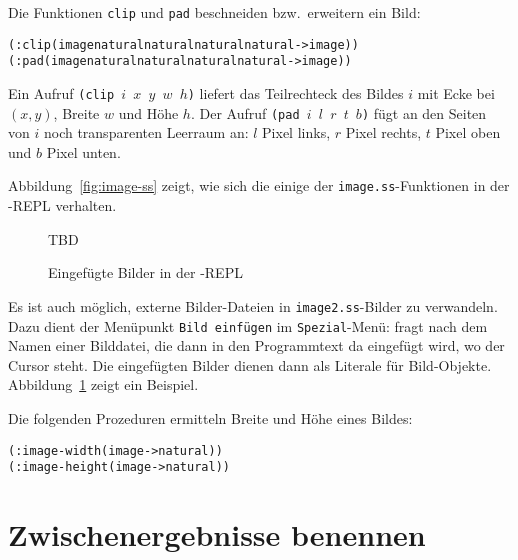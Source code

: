 Die Funktionen \texttt{clip} und \texttt{pad} beschneiden bzw.\
erweitern ein Bild:
%
\begin{alltt}
(: clip (image natural natural natural natural -> image))
(: pad  (image natural natural natural natural -> image))
\end{alltt}
%
Ein Aufruf \texttt{(clip $i$ $x$ $y$ $w$ $h$)} liefert 
das Teilrechteck des Bildes $i$ mit Ecke bei $(x, y)$, Breite $w$ und
Höhe $h$.  Der Aufruf \texttt{(pad $i$ $l$ $r$ $t$ $b$)}
fügt an den Seiten von $i$ noch transparenten Leerraum an: $l$ Pixel
links, $r$ Pixel rechts, $t$ Pixel oben und $b$ Pixel unten.

Abbildung~\ref{fig:image-ss} zeigt, wie sich die einige der
\texttt{image.ss}-Funktionen in der \drscheme{}-REPL verhalten.

\begin{figure}
  \centering
  TBD
  \caption{Eingefügte Bilder in der \drscheme{}-REPL}
  \label{fig:image-insert}
\end{figure}
%
Es ist auch möglich, externe Bilder-Dateien in
\texttt{image2.ss}-Bilder zu verwandeln.  Dazu dient der Menüpunkt
\texttt{Bild einfügen} im \texttt{Spezial}-Menü:  \drscheme{} fragt nach dem
Namen einer Bilddatei, die dann in den Programmtext da eingefügt wird,
wo der Cursor steht.  Die eingefügten Bilder dienen dann als
Literale für Bild-Objekte.  Abbildung~\ref{fig:image-insert} zeigt ein
Beispiel.

Die folgenden Prozeduren ermitteln Breite und Höhe
eines Bildes:
%
\begin{alltt}
(: image-width  (image -> natural))
(: image-height (image -> natural))
\end{alltt}

\section{Zwischenergebnisse benennen}
\label{sec:let}

